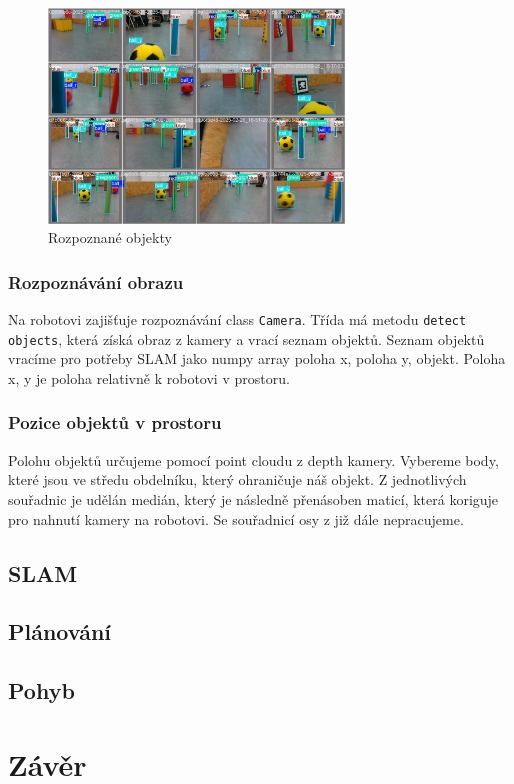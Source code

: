 \documentclass[a4paper,12pt]{article}
\begin{document}
\begin{figure}[H]
    \centering
    \includegraphics[width=0.7\textwidth]{pictures/rozpoznane.jpg}
    \caption{Rozpoznané objekty}
    \label{fig:example_image}
\end{figure}

\subsubsection{Rozpoznávání obrazu}
Na robotovi zajišťuje rozpoznávání class \texttt{Camera}. Třída má metodu \texttt{detect objects}, která získá obraz z kamery a vrací seznam objektů. Seznam objektů vracíme pro potřeby SLAM jako numpy array poloha x, poloha y, objekt. Poloha x, y je poloha relativně k robotovi v prostoru.

\subsubsection{Pozice objektů v prostoru}
Polohu objektů určujeme pomocí point cloudu z depth kamery. Vybereme body, které jsou ve středu obdelníku, který ohraničuje náš objekt. Z jednotlivých souřadnic je udělán medián, který je následně přenásoben maticí, která koriguje pro nahnutí kamery na robotovi. Se souřadnicí osy z již dále nepracujeme.

\subsection{SLAM}
\subsection{Plánování}
\subsection{Pohyb}
\section{Závěr}
\end{document}
